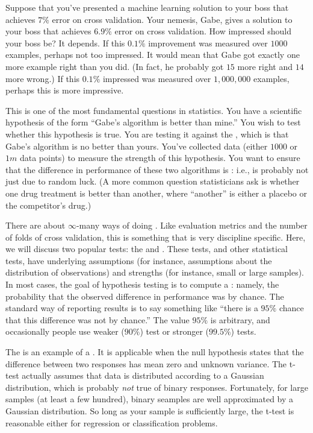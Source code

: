 Suppose that you've presented a machine learning solution to your boss
that achieves $7\%$ error on cross validation.  Your nemesis, Gabe,
gives a solution to your boss that achieves $6.9\%$ error on cross
validation.  How impressed should your boss be?  It depends.  If this
$0.1\%$ improvement was measured over $1000$ examples, perhaps not too
impressed.  It would mean that Gabe got exactly one more example right
than you did.  (In fact, he probably got $15$ more right and $14$ more
wrong.)  If this $0.1\%$ impressed was measured over $1,000,000$
examples, perhaps this is more impressive.

This is one of the most fundamental questions in statistics.  You have
a scientific hypothesis of the form ``Gabe's algorithm is better than
mine.''  You wish to test whether this hypothesis is true.  You are
testing it against the , which is that Gabe's
algorithm is no better than yours.  You've collected data (either
$1000$ or $1m$ data points) to measure the strength of this
hypothesis.  You want to ensure that the difference in performance of
these two algorithms is : i.e., is
probably not just due to random luck.  (A more common question
statisticians ask is whether one drug treatment is better than
another, where ``another'' is either a placebo or the competitor's
drug.)

There are about $\infty$-many ways of doing .  Like evaluation metrics and the number of folds of cross
validation, this is something that is very discipline specific.  Here,
we will discuss two popular tests: the  and
.  These tests, and other statistical tests,
have underlying assumptions (for instance, assumptions about the
distribution of observations) and strengths (for instance, small or
large samples).  In most cases, the goal of hypothesis testing is to
compute a : namely, the probability that the observed
difference in performance was by chance.  The standard way of
reporting results is to say something like ``there is a $95\%$ chance
that this difference was not by chance.''  The value $95\%$ is
arbitrary, and occasionally people use weaker ($90\%$) test or
stronger ($99.5\%$) tests.

The  is an example of a .  It
is applicable when the null hypothesis states that the difference
between two responses has mean zero and unknown variance.  The t-test
actually assumes that data is distributed according to a Gaussian
distribution, which is probably \emph{not} true of binary responses.
Fortunately, for large samples (at least a few hundred), binary
seamples are well approximated by a Gaussian distribution.  So long as
your sample is sufficiently large, the t-test is reasonable either for
regression or classification problems.

